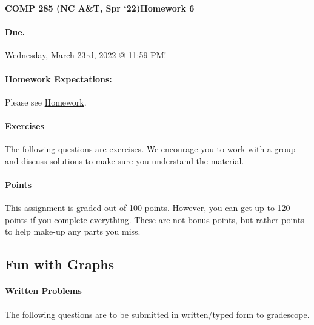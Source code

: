 \documentclass [12pt]{article}
\begin{document}
 

{\LARGE \textbf {COMP 285 (NC A\&T, Spr `22)}\hfill \textbf {Homework 6} } 
\vspace {1em} 
\begin{Instruction} 

\paragraph {Due.} Wednesday, March 23rd, 2022 @ 11:59 PM!
\end{Instruction} 

\vspace {1em} 
\begin{Instruction} \paragraph {Homework Expectations:} Please see \href{https://www.comp285.ml/homework/#general-homework-information}{Homework}.
\end{Instruction}

\vspace {1em} 
\begin{Instruction} 

\paragraph {Exercises} The following questions are exercises. We encourage you to work with a group and discuss solutions to make sure you understand the material.

\paragraph {Points} This assignment is graded out of 100 points. However, you can get up to 120 points if you complete everything. These are not bonus points, but rather points to help make-up any parts you miss.

\end{Instruction} 

\begin{centering}
\section*{Fun with Graphs}
\end{centering}

\begin{Instruction}

\paragraph{Written Problems} The following questions are to be submitted in written/typed form to gradescope.

\end{Instruction}
\end{document}
